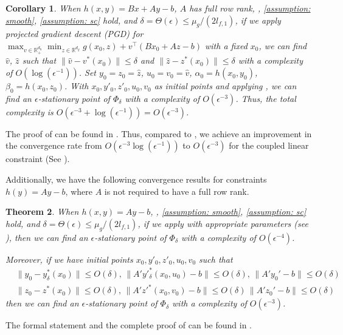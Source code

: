 \documentclass{article}
\def\R{\mathbb{R}}
\theoremstyle{plain}
\newtheorem{theorem}{Theorem}[section]
\newtheorem{corollary}[theorem]{Corollary}
\theoremstyle{definition}
\theoremstyle{remark}
\begin{document}
\begin{corollary}\label{coro: Bx+Ay}
When $h(x,y)=Bx+Ay-b$, $A$ has full row rank, , \ref{assumption: smooth}, \ref{assumption: sc} hold, and $\delta=\Theta(\epsilon)\leq \mu_g/(2l_{f,1})$, if we apply projected gradient descent (PGD) for $\max_{v\in \R^{d_h}_+}\min_{z \in \R^{d_y}}g(x_0,z)+v^\top(Bx_0+Az-b)$ with a fixed $x_0$, we can find $\hat v$, $\hat z$ such that
$\|\hat v-v^*(x_0)\|\leq \delta$ and $\|\hat z-z^*(x_0)\|\leq \delta$
with a complexity of $O(\log(\epsilon^{-1}))$.
Set $y_0=z_0=\hat z$, $u_0=v_0=\hat v$, $\alpha_0=h(x_0,y_0)$, $\beta_0=h(x_0,z_0)$. With $x_0, y'_0, z'_0, u_0, v_0$ as initial points and applying , we can find an $\epsilon$-stationary point of $\Phi_\delta$
with a complexity of $O(\epsilon^{-3})$. Thus, the total complexity is $O(\epsilon^{-3}+\log(\epsilon^{-1}))=O(\epsilon^{-3})$.
\end{corollary}
The proof of  can be found in . Thus, compared to \cite{jiang2024primal}, we achieve an improvement in the convergence rate from $O(\epsilon^{-3}\log(\epsilon^{-1}))$ to $O(\epsilon^{-3})$ for the coupled linear constraint (See ).



Additionally, we have the following convergence
results for constraints $h(y)=Ay-b$, where $A$ is not required to have a full row rank.

\begin{theorem}\label{thm: Ay}
When $h(x,y)=Ay-b$, , \ref{assumption: smooth}, \ref{assumption: sc} hold, and $\delta=\Theta(\epsilon)\leq \mu_g/(2l_{f,1})$, if we apply  with appropriate parameters (see ), then we can find an $\epsilon$-stationary point of $\Phi_\delta$
with a complexity of $O(\epsilon^{-4})$.

Moreover, if we have initial points $x_0, y'_0, z'_0, u_0, v_0$ such that
\begin{align}\label{eq: initial point Ay}
        &\|y_0-y^*_\delta(x_0)\|\leq O(\delta), \, \|A'y'^*_\delta(x_0,u_0)-b\|\leq O(\delta), \, \|A'y_0'-b\|\leq O(\delta)\\
        &\|z_0-z^*(x_0)\|\leq O(\delta),\,\|A'z'^*(x_0,v_0)-b\|\leq O(\delta)\, \|A'z_0'-b\|\leq O(\delta)\label{eq: initial point Ay end}
\end{align}
then we can find an $\epsilon$-stationary point of $\Phi_\delta$
with a complexity of $O(\epsilon^{-3})$.
\end{theorem}
The formal statement and the complete proof of  can be found in . 
\end{document}
